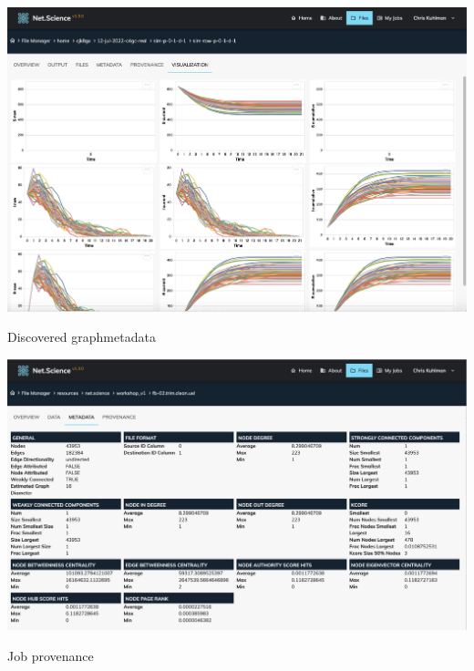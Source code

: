 \documentclass[landscape,paperwidth=70in,paperheight=46in,fontscale=0.225]{baposter} %
\begin{document}
\begin{poster}
{\begin{minipage}{0.35\linewidth}
\includegraphics[scale=0.07]{figures/sim_results_pallet} 
\end{minipage}
\hspace{0.1in}
\begin{minipage}{0.36\linewidth}

Discovered graph\newline metadata

\includegraphics[scale=0.06]{figures/graph_discovered_metadata.png} 
\end{minipage}
\hspace{0.1in}
\begin{minipage}{0.21\linewidth}

Job provenance


\end{minipage}}
\end{poster}
\end{document}
